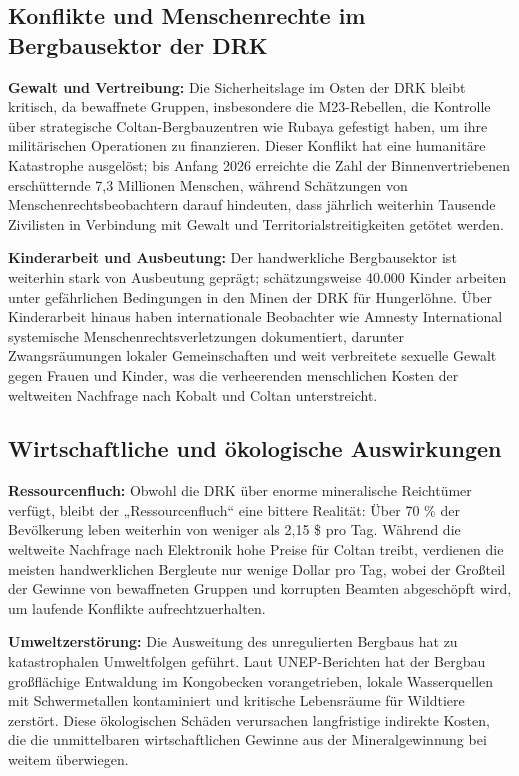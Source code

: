 \documentclass[
  nswissgerman,
  a4paper,
  DIV=11,
  numbers=noendperiod,
  ngerman]{scrreprt}
\begin{document}
\subsection{Konflikte und Menschenrechte im Bergbausektor der
DRK}\label{konflikte-und-menschenrechte-im-bergbausektor-der-drk}

\textbf{Gewalt und Vertreibung:} Die Sicherheitslage im Osten der DRK
bleibt kritisch, da bewaffnete Gruppen, insbesondere die M23-Rebellen,
die Kontrolle über strategische Coltan-Bergbauzentren wie Rubaya
gefestigt haben, um ihre militärischen Operationen zu finanzieren.
Dieser Konflikt hat eine humanitäre Katastrophe ausgelöst; bis Anfang
2026 erreichte die Zahl der Binnenvertriebenen erschütternde 7,3
Millionen Menschen, während Schätzungen von Menschenrechtsbeobachtern
darauf hindeuten, dass jährlich weiterhin Tausende Zivilisten in
Verbindung mit Gewalt und Territorialstreitigkeiten getötet werden.

\textbf{Kinderarbeit und Ausbeutung:} Der handwerkliche Bergbausektor
ist weiterhin stark von Ausbeutung geprägt; schätzungsweise 40.000
Kinder arbeiten unter gefährlichen Bedingungen in den Minen der DRK für
Hungerlöhne. Über Kinderarbeit hinaus haben internationale Beobachter
wie Amnesty International systemische Menschenrechtsverletzungen
dokumentiert, darunter Zwangsräumungen lokaler Gemeinschaften und weit
verbreitete sexuelle Gewalt gegen Frauen und Kinder, was die
verheerenden menschlichen Kosten der weltweiten Nachfrage nach Kobalt
und Coltan unterstreicht.

\subsection{Wirtschaftliche und ökologische
Auswirkungen}\label{wirtschaftliche-und-uxf6kologische-auswirkungen}

\textbf{Ressourcenfluch:} Obwohl die DRK über enorme mineralische
Reichtümer verfügt, bleibt der „Ressourcenfluch`` eine bittere Realität:
Über 70 \% der Bevölkerung leben weiterhin von weniger als 2,15 \$ pro
Tag. Während die weltweite Nachfrage nach Elektronik hohe Preise für
Coltan treibt, verdienen die meisten handwerklichen Bergleute nur wenige
Dollar pro Tag, wobei der Großteil der Gewinne von bewaffneten Gruppen
und korrupten Beamten abgeschöpft wird, um laufende Konflikte
aufrechtzuerhalten.

\textbf{Umweltzerstörung:} Die Ausweitung des unregulierten Bergbaus hat
zu katastrophalen Umweltfolgen geführt. Laut UNEP-Berichten hat der
Bergbau großflächige Entwaldung im Kongobecken vorangetrieben, lokale
Wasserquellen mit Schwermetallen kontaminiert und kritische Lebensräume
für Wildtiere zerstört. Diese ökologischen Schäden verursachen
langfristige indirekte Kosten, die die unmittelbaren wirtschaftlichen
Gewinne aus der Mineralgewinnung bei weitem überwiegen.
\end{document}
